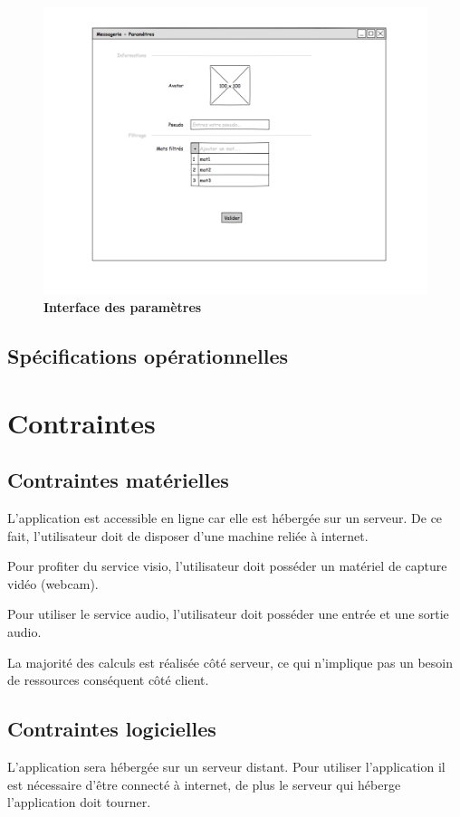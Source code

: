 \documentclass[11pt,dvipsnames,svgnames]{report}
\begin{document}
\begin{center}
\begin{figure}
\includegraphics[width=\textwidth]{maquette/maquette3.png}
\caption{\textbf{Interface des paramètres}}
\end{figure}
\end{center}


\section{Spécifications opérationnelles}

\chapter{Contraintes}
\section{Contraintes matérielles}
L'application est accessible en ligne car elle est hébergée sur un serveur. De ce fait, l'utilisateur doit de disposer d'une machine reliée à internet.

Pour profiter du service visio, l'utilisateur doit posséder un matériel de capture vidéo (webcam).

Pour utiliser le service audio, l'utilisateur doit posséder une entrée et une sortie audio.

La majorité des calculs est réalisée côté serveur, ce qui n'implique pas un besoin de ressources conséquent côté client.

\section{Contraintes logicielles}
L'application sera hébergée sur un serveur distant.
Pour utiliser l'application il est nécessaire d'être connecté à internet, de plus le serveur qui héberge l'application doit tourner.
\end{document}

